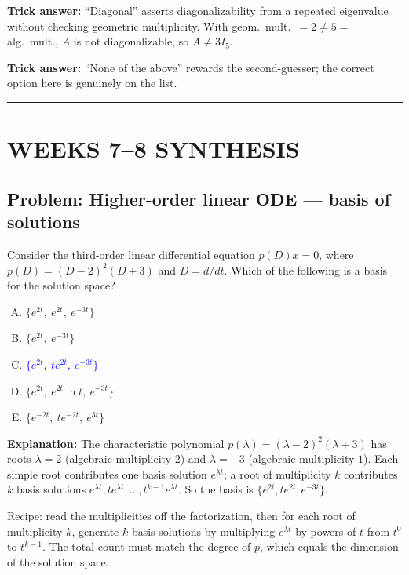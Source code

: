 \documentclass[12pt]{amsart}
\newcommand{\divider}{
  \vspace{-1em}
  \noindent
  \raisebox{-0.15ex}{\textbullet}%
  \hspace{0.5em}%
  \rule[0.5ex]{0.95\textwidth}{1.0pt}%
  \hspace{0.5em}%
  \raisebox{-0.15ex}{\textbullet}%
  \vspace{0em}
}
\begin{document}
\textbf{Trick answer:}
``Diagonal'' asserts diagonalizability from a repeated eigenvalue without
checking geometric multiplicity. With geom.\ mult.\ $= 2 \neq 5 =$ alg.\ mult.,
$A$ is not diagonalizable, so $A \neq 3I_5$.

\textbf{Trick answer:}
``None of the above'' rewards the second-guesser; the correct option here
is genuinely on the list.

\divider

\section*{WEEKS 7--8 SYNTHESIS}

\subsection*{Problem: Higher-order linear ODE --- basis of solutions}

Consider the third-order linear differential equation $p(D)x = 0$, where
$p(D) = (D - 2)^2 (D + 3)$ and $D = d/dt$. Which of the following is a basis
for the solution space?

\begin{enumerate}[(A)]
\item $\{e^{2t},\ e^{2t},\ e^{-3t}\}$
\item $\{e^{2t},\ e^{-3t}\}$
\item \textcolor{blue}{\textbf{$\{e^{2t},\ t e^{2t},\ e^{-3t}\}$}}
\item $\{e^{2t},\ e^{2t} \ln t,\ e^{-3t}\}$
\item $\{e^{-2t},\ t e^{-2t},\ e^{3t}\}$
\end{enumerate}

\textbf{Explanation:}
The characteristic polynomial $p(\lambda) = (\lambda - 2)^2 (\lambda + 3)$
has roots $\lambda = 2$ (algebraic multiplicity $2$) and $\lambda = -3$
(algebraic multiplicity $1$). Each simple root contributes one basis solution
$e^{\lambda t}$; a root of multiplicity $k$ contributes $k$ basis solutions
$e^{\lambda t}, t e^{\lambda t}, \ldots, t^{k-1} e^{\lambda t}$. So the
basis is $\{e^{2t}, t e^{2t}, e^{-3t}\}$.

Recipe: read the multiplicities off the factorization, then for each root
of multiplicity $k$, generate $k$ basis solutions by multiplying $e^{\lambda t}$
by powers of $t$ from $t^0$ to $t^{k-1}$. The total count must match the
degree of $p$, which equals the dimension of the solution space.
\end{document}
